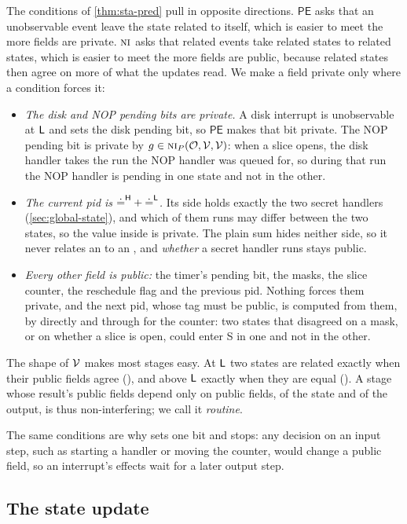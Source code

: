 The conditions of \cref{thm:sta-pred} pull in opposite directions.
$\mathsf{PE}$ asks that an unobservable event leave the state related to itself, which is
easier to meet the more fields are private. $\text{\normalfont\scshape ni}$ asks that related events take related
states to related states, which is easier to meet the more fields are public, because
related states then agree on more of what the updates read. We make a field private only
where a condition forces it:
\begin{itemize}
\item \emph{The disk and NOP pending bits are private.} A disk interrupt is
  unobservable at $\mathsf{L}$ and sets the disk pending bit, so $\mathsf{PE}$ makes that bit
  private. The NOP pending bit is private by $g \in \text{\normalfont\scshape ni}_P(\mathcal{O},\mathcal{V},\mathcal{V})$:
  when a slice opens, the disk handler takes the
  run the NOP handler was queued for, so during that run the NOP handler is pending
  in one state and not in the other.
\item \emph{The current pid is ${\doteq^{\mathsf{H}}} + {\doteq^{\mathsf{L}}}$.} Its
   side holds exactly the two secret handlers (\cref{sec:global-state}),
  and which of them runs may differ between the two states, so the value inside
   is private. The plain sum hides neither side, so it never relates an  to an , and \emph{whether} a secret
  handler runs stays public.
\item \emph{Every other field is public:} the timer's pending bit, the masks, the
  slice counter, the reschedule flag and the previous pid. Nothing forces them private, and
  the next pid, whose tag must be public, is computed from them, by
   directly and through  for the counter:
  two states that disagreed on a mask, or on whether a slice is
  open, could enter S in one and not in the other.
\end{itemize}
The shape of $\mathcal{V}$ makes most stages easy. At $\mathsf{L}$ two states are related exactly when
their public fields agree (), and above $\mathsf{L}$ exactly when they are
equal (). A stage whose result's public fields depend only on public fields, of the
state and of the output, is thus non-interfering; we call it \emph{routine}.

The same conditions are why  sets one bit and stops: any decision
on an input step, such as starting a handler or moving the counter, would change a
public field, so an interrupt's effects wait for a later output step.

\subsection{The state update}\label{sec:update}

